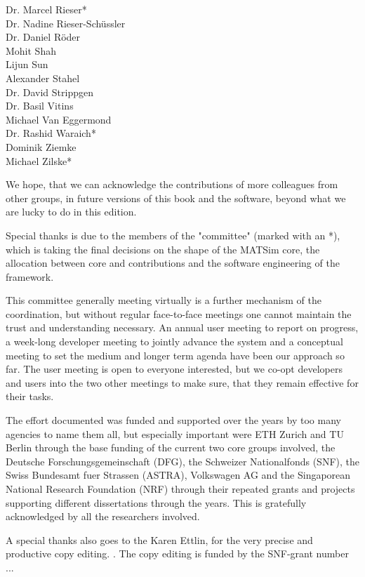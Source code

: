 \begin{multicols}{3}
Dr. Marcel Rieser\mbox{*} \\
Dr. Nadine Rieser-Schüssler \\
Dr. Daniel Röder \\
Mohit Shah \\
Lijun Sun \\
Alexander Stahel \\
Dr. David Strippgen \\
Dr. Basil Vitins \\
Michael Van Eggermond \\
Dr. Rashid Waraich\mbox{*} \\
Dominik Ziemke \\
Michael Zilske\mbox{*} \\
\end{multicols}
% 
We hope, that we can acknowledge the contributions of more colleagues from other groups, in future versions of this book and the software, beyond what we are lucky to do in this edition.   

Special thanks is due to the members of the "committee" (marked with an \mbox{*}), which is taking the final decisions on the shape of the MATSim core, the allocation between core and contributions and the software engineering of the framework.

This committee generally meeting virtually is a further mechanism of the coordination, but without regular face-to-face meetings one cannot maintain the trust and understanding necessary. An annual user meeting to report on progress, a week-long developer meeting to jointly advance the system and a conceptual meeting to set the medium and longer term agenda have been our approach so far. The user meeting is open to everyone interested, but we co-opt developers and users into the two other meetings to make sure, that they remain effective for their tasks. 

The effort documented was funded and supported over the years by too many agencies to name them all, but especially important were ETH Zurich and TU Berlin through the base funding of the current two core groups involved, the Deutsche Forschungsgemeinschaft (DFG), the Schweizer Nationalfonds (SNF), the Swiss Bundesamt fuer Strassen (ASTRA), Volkswagen AG and the Singaporean National Research Foundation (NRF) through their repeated grants and projects supporting different dissertations through the years. This is gratefully acknowledged by all the researchers involved. 

A special thanks also goes to the Karen Ettlin, for the very precise and productive copy editing. . The copy editing is funded by the SNF-grant number ... 

